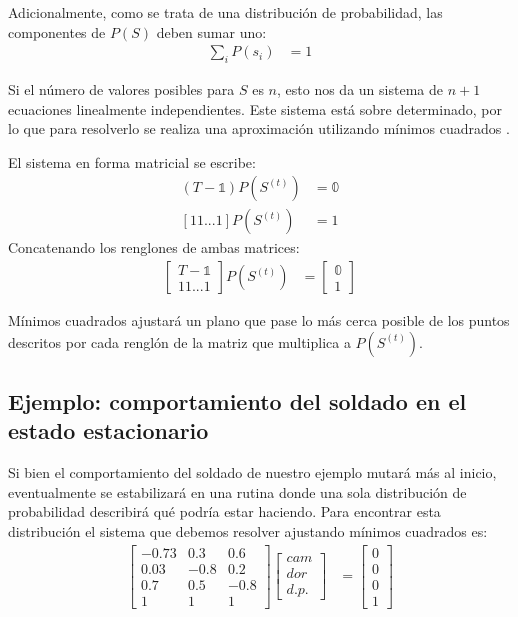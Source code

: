 Adicionalmente, como se trata de una distribución de probabilidad, las componentes de $P(S)$ deben sumar uno:
\begin{align*}
 \sum_i P(s_i) &= 1
\end{align*}

Si el número de valores posibles para $S$ es $n$, esto nos da un sistema de $n+1$ ecuaciones linealmente independientes.  Este sistema está sobre determinado, por lo que para resolverlo se realiza una aproximación utilizando mínimos cuadrados \parencite{Maplesoft2022}.

El sistema en forma matricial se escribe:
\begin{align*}
 (T - \mathbb{1})P(S^{(t)}) &= \mathbb{0} \\
 [1 1 ... 1]P(S^{(t)}) &= 1
\end{align*}
Concatenando los renglones de ambas matrices:
\begin{align*}
 \begin{bmatrix}
   T - \mathbb{1} \\
   1 1 ... 1
 \end{bmatrix}
 P(S^{(t)}) &=
 \begin{bmatrix}
  \mathbb{0} \\
  1
 \end{bmatrix}
\end{align*}

Mínimos cuadrados ajustará un plano que pase lo más cerca posible de los puntos descritos por cada renglón de la matriz que multiplica a $P(S^{(t)})$.


\subsection{Ejemplo: comportamiento del soldado en el estado estacionario}

Si bien el comportamiento del soldado de nuestro ejemplo mutará más al inicio, eventualmente se estabilizará en una rutina donde una sola distribución de probabilidad describirá qué podría estar haciendo.  Para encontrar esta distribución el sistema que debemos resolver ajustando mínimos cuadrados es:
\begin{align*}
 \begin{bmatrix}
  -0.73 & 0.3  & 0.6 \\
   0.03 & -0.8 & 0.2 \\
   0.7  &  0.5 & -0.8 \\
   1    &  1   &  1
 \end{bmatrix}
 \begin{bmatrix}
  cam \\
  dor \\
  d.p.
 \end{bmatrix} &=
 \begin{bmatrix}
  0 \\
  0 \\
  0 \\
  1
 \end{bmatrix}
\end{align*}

